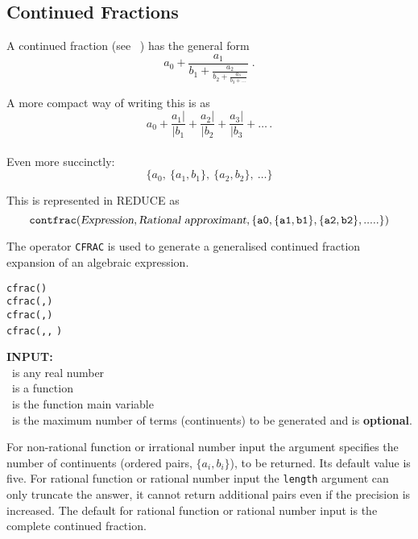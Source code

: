 %
%
%
\subsection{Continued Fractions}

A continued fraction (see ~\cite{CF}) has the general form
{\Large
\[a_0 + \frac{a_1}{b_1 +
         \frac{a_2}{b_2+
          \frac{a_3}{b_3 + \ldots
        }}}
\;.\]
}

A more compact way of writing this is as
\[a_0 + \frac{a_1|}{|b_1} + \frac{a_2|}{|b_2} + \frac{a_3|}{|b_3} + \ldots\,.\]
\\
Even more succinctly:
\[\{a_0,\ \{a_1, b_1\},\ \{a_2, b_2\},\ \ldots\}\]

%
This is represented in {\small REDUCE} as
\[{\tt
  contfrac(\textsl{Expression},
    \textsl{Rational approximant},
                \{a0, \{a1,b1\}, \{a2,b2\},.....\})
}\]

\hypertarget{CFRAC:operator}{}
The operator \texttt{CFRAC} is used to generate a generalised continued
fraction expansion of an algebraic expression.\\
\begin{syntaxtable}
  \texttt{cfrac(}\texttt{)} \\
  \texttt{cfrac(}\texttt{,}\texttt{)}\\
  \texttt{cfrac(}\texttt{,}\texttt{)}\\
  \texttt{cfrac(}\texttt{,}\texttt{,}
  \texttt{)}
\end{syntaxtable}


\textbf{INPUT:}\\
 \ is any real number\\
 \ is a function\\
 \ is the function main variable\\
 \ is the maximum number of terms (continuents) to be
generated and is \textbf{optional}.

For non-rational function or irrational number input the 
argument specifies the number of continuents (ordered pairs, $\{a_i,b_i\}$),
to be returned. Its default value is five.
For rational function or rational number input the
\texttt{length} argument can only truncate the answer, it cannot
return additional pairs even if the precision is increased.
The default for rational function or rational number input is the
complete continued fraction.

